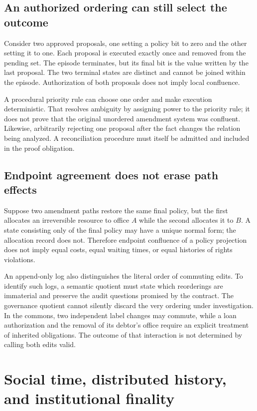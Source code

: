 \documentclass[11pt,letterpaper]{article}
\theoremstyle{plain}
\theoremstyle{definition}
\theoremstyle{remark}
\begin{document}
\subsection{An authorized ordering can still select the outcome}
Consider two approved proposals, one setting a policy bit to zero and the other setting it to one. Each proposal is executed exactly once and removed from the pending set. The episode terminates, but its final bit is the value written by the last proposal. The two terminal states are distinct and cannot be joined within the episode. Authorization of both proposals does not imply local confluence.

A procedural priority rule can choose one order and make execution deterministic. That resolves ambiguity by assigning power to the priority rule; it does not prove that the original unordered amendment system was confluent. Likewise, arbitrarily rejecting one proposal after the fact changes the relation being analyzed. A reconciliation procedure must itself be admitted and included in the proof obligation.

\subsection{Endpoint agreement does not erase path effects}
Suppose two amendment paths restore the same final policy, but the first allocates an irreversible resource to office $A$ while the second allocates it to $B$. A state consisting only of the final policy may have a unique normal form; the allocation record does not. Therefore endpoint confluence of a policy projection does not imply equal costs, equal waiting times, or equal histories of rights violations.

An append-only log also distinguishes the literal order of commuting edits. To identify such logs, a semantic quotient must state which reorderings are immaterial and preserve the audit questions promised by the contract. The governance quotient cannot silently discard the very ordering under investigation. In the commons, two independent label changes may commute, while a loan authorization and the removal of its debtor's office require an explicit treatment of inherited obligations. The outcome of that interaction is not determined by calling both edits valid.

\section{Social time, distributed history, and institutional finality}\label{sec:social-time}
\end{document}
